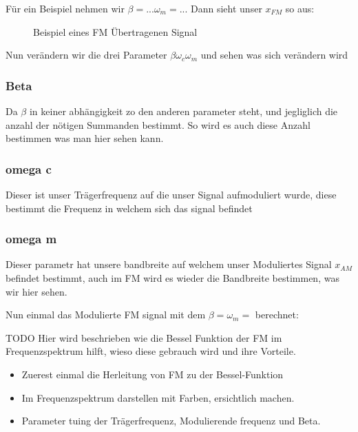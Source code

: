 Für ein Beispiel nehmen wir  \(\beta = ... \omega_m = ... \)
Dann sieht unser \(x_{FM}\) so aus:
\begin{figure}
	\centering
	
	\caption{Beispiel eines FM Übertragenen Signal}
	\label{fig:bessel}
\end{figure}
Nun verändern wir die drei Parameter \(\beta \omega_c \omega_m \) und sehen was sich verändern wird
\subsubsection{Beta}
Da \(\beta\) in keiner abhängigkeit zo den anderen parameter steht, und jegliglich die anzahl der nötigen Summanden bestimmt.
So wird es auch diese Anzahl bestimmen was man hier sehen kann.
\subsubsection{omega c}
Dieser ist unser Trägerfrequenz auf die unser Signal aufmoduliert wurde, diese bestimmt die Frequenz in welchem sich das signal befindet
\subsubsection{omega m}
Dieser parametr hat unsere bandbreite auf welchem unser Moduliertes Signal \(x_{AM}\) befindet bestimmt, auch im FM wird es wieder die Bandbreite bestimmen, was wir hier sehen.

Nun einmal das Modulierte FM signal mit dem \(\beta =  \omega_m =  \) berechnet:



TODO
Hier wird beschrieben wie die Bessel Funktion der FM im Frequenzspektrum hilft, wieso diese gebrauch wird und ihre Vorteile.
\begin{itemize}
    \item Zuerest einmal die Herleitung von FM zu der Bessel-Funktion
    \item Im Frequenzspektrum darstellen mit Farben, ersichtlich machen. 
    \item Parameter tuing der Trägerfrequenz, Modulierende frequenz und Beta. 
\end{itemize}
\newpage





